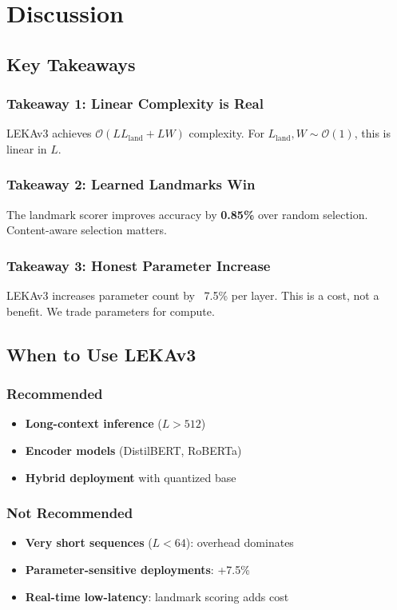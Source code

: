 \section{Discussion}

\subsection{Key Takeaways}

\subsubsection{Takeaway 1: Linear Complexity is Real}

LEKAv3 achieves $\mathcal{O}(L L_\text{land} + L W)$ complexity. For 
$L_\text{land}, W \sim \mathcal{O}(1)$, this is linear in $L$.

\subsubsection{Takeaway 2: Learned Landmarks Win}

The landmark scorer improves accuracy by \textbf{0.85\%} over random 
selection. Content-aware selection matters.

\subsubsection{Takeaway 3: Honest Parameter Increase}

LEKAv3 increases parameter count by ~7.5\% per layer. This is a cost, not a 
benefit. We trade parameters for compute.

\subsection{When to Use LEKAv3}

\subsubsection{Recommended}
\begin{itemize}
\item \textbf{Long-context inference} ($L > 512$)
\item \textbf{Encoder models} (DistilBERT, RoBERTa)
\item \textbf{Hybrid deployment} with quantized base

\end{itemize}
\subsubsection{Not Recommended}
\begin{itemize}
\item \textbf{Very short sequences} ($L < 64$): overhead dominates
\item \textbf{Parameter-sensitive deployments}: +7.5\%
\item \textbf{Real-time low-latency}: landmark scoring adds cost

\end{itemize}
